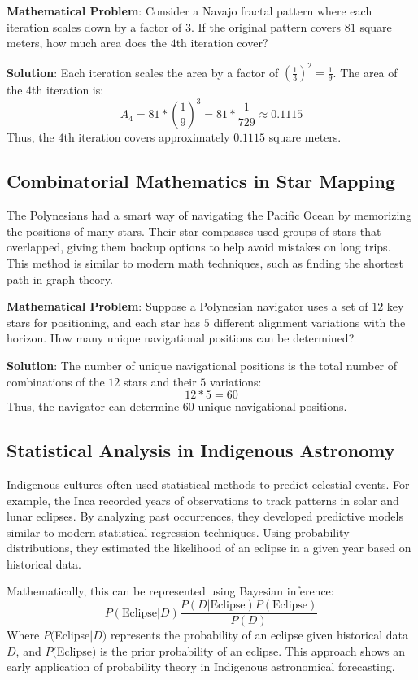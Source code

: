\documentclass{article}
\begin{document}
\begin{multicols}{2}
\textbf{Mathematical Problem}:   Consider a Navajo fractal pattern where each iteration scales down by a factor of $3$. If the original pattern covers $81$ square meters, how much area does the $4$th iteration cover?

\textbf{Solution}:  Each iteration scales the area by a factor of $ (\frac{1}{3})^2 = \frac{1}{9}$. The area of the $4$th iteration is:
\begin{equation*}
A_4 = 81 * (\frac{1}{9})^3 = 81 * \frac{1}{729} \approx0.1115
\end{equation*}
Thus, the $4$th iteration covers approximately $0.1115$ square meters.
\subsection*{Combinatorial Mathematics in Star Mapping}
The Polynesians had a smart way of navigating the Pacific Ocean by memorizing the positions of many stars. Their star compasses used groups of stars that overlapped, giving them backup options to help avoid mistakes on long trips. This method is similar to modern math techniques, such as finding the shortest path in graph theory.

\textbf{Mathematical Problem}:   Suppose a Polynesian navigator uses a set of $12$ key stars for positioning, and each star has $5$ different alignment variations with the horizon. How many unique navigational positions can be determined?

\textbf{Solution}:   The number of unique navigational positions is the total number of combinations of the $12$ stars and their $5$ variations:
\begin{equation*}
12 * 5 = 60
\end{equation*}
Thus, the navigator can determine $60$ unique navigational positions.
\subsection*{Statistical Analysis in Indigenous Astronomy}
Indigenous cultures often used statistical methods to predict celestial events. For example, the Inca recorded years of observations to track patterns in solar and lunar eclipses. By analyzing past occurrences, they developed predictive models similar to modern statistical regression techniques. Using probability distributions, they estimated the likelihood of an eclipse in a given year based on historical data.

Mathematically, this can be represented using Bayesian inference:
\begin{equation*}
    P(\text{Eclipse}|D) \frac{P(D|\text{Eclipse})P(\text{Eclipse})}{P(D)}
\end{equation*}
Where $P($Eclipse$|D)$ represents the probability of an eclipse given historical data $D$, and $P($Eclipse$)$ is the prior probability of an eclipse. This approach shows an early application of probability theory in Indigenous astronomical forecasting.

\end{multicols}
\end{document}
